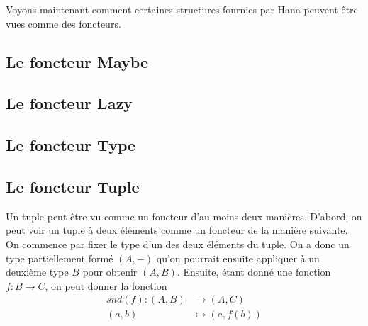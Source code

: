 Voyons maintenant comment certaines structures fournies par Hana peuvent
être vues comme des foncteurs.


\subsection{Le foncteur Maybe}


\subsection{Le foncteur Lazy}


\subsection{Le foncteur Type}



\subsection{Le foncteur Tuple}
Un tuple peut être vu comme un foncteur d'au moins deux manières. D'abord,
on peut voir un tuple à deux éléments comme un foncteur de la manière suivante.
On commence par fixer le type d'un des deux éléments du tuple. On a donc un
type partiellement formé $(A, -)$ qu'on pourrait ensuite appliquer à un
deuxième type $B$ pour obtenir $(A, B)$. Ensuite, étant donné une fonction
$f : B \to C$, on peut donner la fonction
\begin{align*}
    snd(f) : (A, B) &\to (A, C)             \\
             (a, b) &\mapsto (a, f(b))
\end{align*}

